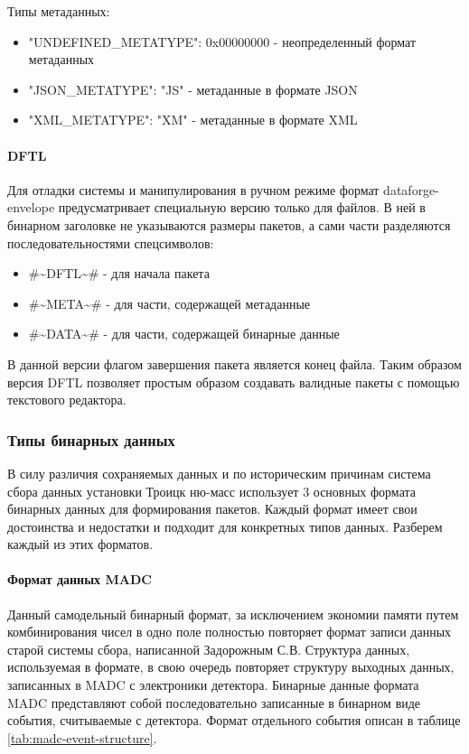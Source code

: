 \documentclass[a4paper,14pt]{extreport}
\begin{document}
Типы метаданных:
\begin{itemize}
    \item "UNDEFINED\_METATYPE": 0x00000000 - неопределенный формат метаданных
    \item "JSON\_METATYPE": "JS" - метаданные в формате JSON
    \item "XML\_METATYPE": "XM" - метаданные в формате XML
\end{itemize}

\paragraph{DFTL}
Для отладки системы и манипулирования в ручном режиме формат dataforge-envelope предусматривает специальную версию только для файлов. В ней в бинарном заголовке не указываются размеры пакетов, а сами части разделяются последовательностями спецсимволов:
\begin{itemize}
    \item \#\textasciitilde DFTL\textasciitilde\# - для начала пакета
    \item \#\textasciitilde META\textasciitilde\# - для части, содержащей метаданные
    \item \#\textasciitilde DATA\textasciitilde\# - для части, содержащей бинарные данные
\end{itemize}
В данной версии флагом завершения пакета является конец файла. Таким образом версия DFTL позволяет простым образом создавать валидные пакеты с помощью текстового редактора.

\subsubsection{Типы бинарных данных}
В силу различия сохраняемых данных и по историческим причинам система сбора данных установки Троицк ню-масс использует 3 основных формата бинарных данных для формирования пакетов. Каждый формат имеет свои достоинства и недостатки и подходит для конкретных типов данных. Разберем каждый из этих форматов.

\paragraph{Формат данных MADC}
Данный самодельный бинарный формат, за исключением экономии памяти путем комбинирования чисел в одно поле полностью повторяет формат записи данных старой системы сбора, написанной Задорожным С.В. Структура данных, используемая в формате, в свою очередь повторяет структуру выходных данных, записанных в  MADC с электроники детектора. Бинарные данные формата MADC представляют собой последовательно записанные в бинарном виде события, считываемые с детектора. Формат отдельного события описан в таблице \ref{tab:madc-event-structure}.
\end{document}
